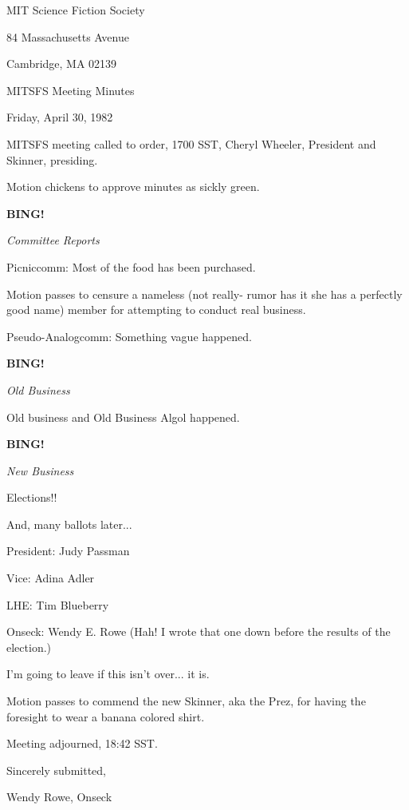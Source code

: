 \documentclass[12pt]{article}
\newcommand{\bing}{{\bf BING!} }
\newcommand{\goto}[1]{\bing \vskip 12pt \centerline{{\em{#1}}}}
\begin{document}
\begin{center}

MIT Science Fiction Society 

84 Massachusetts Avenue

Cambridge, MA 02139

\vspace{12pt}

MITSFS Meeting Minutes 

Friday, April 30, 1982

\end{center}
 
\vspace{18pt}

\setlength{\parskip}{6pt}

\noindent
MITSFS meeting called to order, 1700 SST,
Cheryl Wheeler, President and Skinner, presiding.

Motion chickens to approve minutes as sickly green.

\goto{Committee Reports}

Picniccomm: Most of the food has been purchased.

Motion passes to censure a nameless (not really- rumor has it she has a perfectly good name) member for attempting to conduct real business.

Pseudo-Analogcomm: Something vague happened.

\goto{Old Business}

Old business and Old Business Algol happened.

\goto{New Business}

Elections!!

And, many ballots later...

President: Judy Passman

Vice: Adina Adler

LHE: Tim Blueberry

Onseck: Wendy E. Rowe (Hah! I wrote that one down before the results of the election.)

I'm going to leave if this isn't over... it is.

Motion passes to commend the new Skinner, aka the Prez, for having the foresight to wear a banana colored shirt.

\vspace{12pt}

\noindent
Meeting adjourned, 18:42 SST.

\vspace{18pt}

\centerline{Sincerely submitted,}
\centerline{Wendy Rowe, Onseck}
\end{document}
